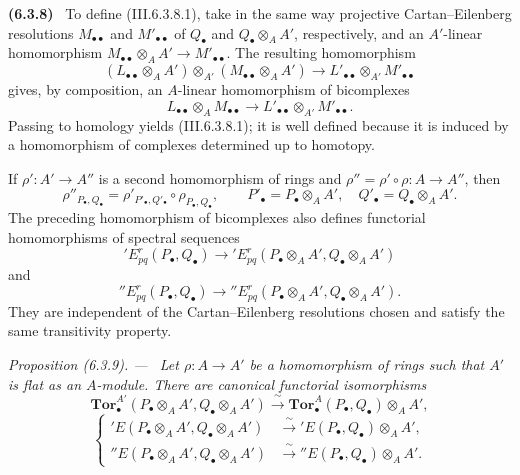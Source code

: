 \documentclass[10pt,oneside]{book}
\newcommand{\sref}[2][]{(#2)}
\newenvironment{env}[1][]{\par\medskip\noindent\textbf{(#1)}\ }{\par}
\newenvironment{proposition}[1][]{\par\medskip\noindent\itshape Proposition (#1). ---\ }{\par}
\begin{document}
\begin{env}[6.3.8]
To define \sref{III.6.3.8.1}, take in the same way projective
Cartan--Eilenberg resolutions $M_{\bullet\bullet}$ and
$M'_{\bullet\bullet}$ of $Q_\bullet$ and
$Q_\bullet\otimes_AA'$, respectively, and an $A'$-linear
homomorphism
$M_{\bullet\bullet}\otimes_AA'\longrightarrow M'_{\bullet\bullet}$.
The resulting homomorphism
\[
  (L_{\bullet\bullet}\otimes_AA')
  \otimes_{A'}
  (M_{\bullet\bullet}\otimes_AA')
  \longrightarrow
  L'_{\bullet\bullet}\otimes_{A'}M'_{\bullet\bullet}
\]
gives, by composition, an $A$-linear homomorphism of bicomplexes
\[
  L_{\bullet\bullet}\otimes_AM_{\bullet\bullet}
  \longrightarrow
  L'_{\bullet\bullet}\otimes_{A'}M'_{\bullet\bullet}.
\]
Passing to homology yields \sref{III.6.3.8.1}; it is well defined
because it is induced by a homomorphism of complexes determined up
to homotopy.

If $\rho':A'\longrightarrow A''$ is a second homomorphism of rings
and $\rho''=\rho'\circ\rho:A\longrightarrow A''$, then
\[
  \rho''_{P_\bullet,Q_\bullet}
  =
  \rho'_{P'_\bullet,Q'_\bullet}
  \circ
  \rho_{P_\bullet,Q_\bullet},
  \qquad
  P'_\bullet=P_\bullet\otimes_AA',
  \quad
  Q'_\bullet=Q_\bullet\otimes_AA'.
\]
The preceding homomorphism of bicomplexes also defines functorial
homomorphisms of spectral sequences
\[
  'E_{pq}^r(P_\bullet,Q_\bullet)
  \longrightarrow
  'E_{pq}^r(P_\bullet\otimes_AA',Q_\bullet\otimes_AA')
\]
and
\[
  ''E_{pq}^r(P_\bullet,Q_\bullet)
  \longrightarrow
  ''E_{pq}^r(P_\bullet\otimes_AA',Q_\bullet\otimes_AA').
\]
They are independent of the Cartan--Eilenberg resolutions chosen
and satisfy the same transitivity property.
\end{env}

\begin{proposition}[6.3.9]
\label{III.6.3.9}
Let $\rho:A\longrightarrow A'$ be a homomorphism of rings such that
$A'$ is flat as an $A$-module.  There are canonical functorial
isomorphisms
\[
  \mathbf{Tor}_\bullet^{A'}
  (P_\bullet\otimes_AA',Q_\bullet\otimes_AA')
  \xrightarrow{\ \sim\ }
  \mathbf{Tor}_\bullet^A(P_\bullet,Q_\bullet)\otimes_AA',
  \tag{6.3.9.1}\label{III.6.3.9.1}
\]
\[
  \left\{
  \begin{aligned}
  'E(P_\bullet\otimes_AA',Q_\bullet\otimes_AA')
    &\xrightarrow{\ \sim\ }
      'E(P_\bullet,Q_\bullet)\otimes_AA',\\
  ''E(P_\bullet\otimes_AA',Q_\bullet\otimes_AA')
    &\xrightarrow{\ \sim\ }
      ''E(P_\bullet,Q_\bullet)\otimes_AA'.
  \end{aligned}
  \right.
  \tag{6.3.9.2}\label{III.6.3.9.2}
\]
\end{proposition}
\end{document}

